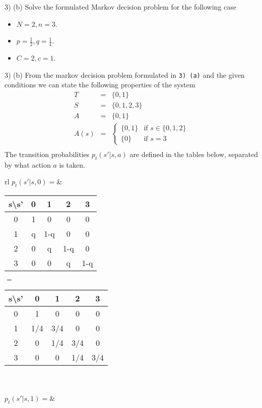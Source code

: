 \documentclass[11pt,a4paper]{article}
\begin{document}
\begin{question}{3) (b)}
  Solve the formulated Markov decision problem for the following case
  \begin{itemize}
    \item $N=2,n=3$.
    \item $p=\frac12,q=\frac14$.
    \item $C=2,c=1$.
  \end{itemize}
\end{question}

\begin{answer}{3) (b)}
  From the markov decision problem formulated in \texttt{3) (a)} and the given conditions we can state the following properties of the system
  \[\begin{array}{rcl}
    T&=&\{0,1\}\\
    S&=&\{0,1,2,3\}\\
    A&=&\{0,1\}\\
    A(s)&=&\begin{cases}
             \{0,1\}&\text{if }s\in\{0,1,2\}\\
             \{0\}&\text{if }s=3
           \end{cases}\\
  \end{array}\]
  The transition probabilities $p_t(s'|s,a)$ are defined in the tables below, separated by what action $a$ is taken.
  \begin{adjustwidth}{-2cm}{}
    \begin{tabular}{rl}
      $p_t(s'|s,0)=$&\begin{tabular}{c|cccc}
      s\textbackslash s'&0&1&2&3\\\hline
      0&1&0&0&0\\
      1&q&1-q&0&0\\
      2&0&q&1-q&0\\
      3&0&0&q&1-q
      \end{tabular}$=$
      \begin{tabular}{c|cccc}
        s\textbackslash s'&0&1&2&3\\\hline
        0&1&0&0&0\\
        1&1/4&3/4&0&0\\
        2&0&1/4&3/4&0\\
        3&0&0&1/4&3/4
      \end{tabular}\\\\
      $p_t(s'|s,1)=$&\begin{tabular}{c|cccc}

\end{tabular}
\end{tabular}
\end{adjustwidth}
\end{answer}
\end{document}
